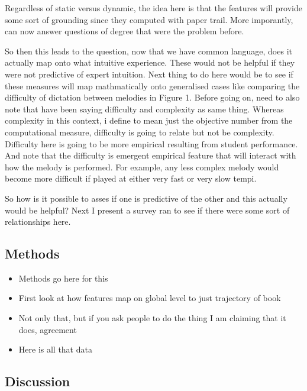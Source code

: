 \documentclass[english,man,floatsintext]{apa6}
\providecommand{\tightlist}{%
  \setlength{\itemsep}{0pt}\setlength{\parskip}{0pt}}
\begin{document}
Regardless of static versus dynamic, the idea here is that the features will provide some sort of grounding since they computed with paper trail.
More imporantly, can now answer questions of degree that were the problem before.

So then this leads to the question, now that we have common language, does it actually map onto what intuitive experience.
These would not be helpful if they were not predictive of expert intuition.
Next thing to do here would be to see if these measures will map mathmatically onto generalised cases like comparing the difficulty of dictation between melodies in Figure 1.
Before going on, need to also note that have been saying difficulty and complexity as same thing.
Whereas complexity in this context, i define to mean just the objective number from the computational measure, difficulty is going to relate but not be complexity.
Difficulty here is going to be more empirical resulting from student performance.
And note that the difficulty is emergent empirical feature that will interact with how the melody is performed.
For example, any less complex melody would become more difficult if played at either very fast or very slow tempi.

So how is it possible to asses if one is predictive of the other and this actually would be helpful?
Next I present a survey ran to see if there were some sort of relationships here.

\hypertarget{methods}{%
\subsection{Methods}\label{methods}}

\begin{itemize}
\tightlist
\item
  Methods go here for this
\item
  First look at how features map on global level to just trajectory of book
\item
  Not only that, but if you ask people to do the thing I am claiming that it does, agreement
\item
  Here is all that data
\end{itemize}

\hypertarget{discussion}{%
\subsection{Discussion}\label{discussion}}
\end{document}
